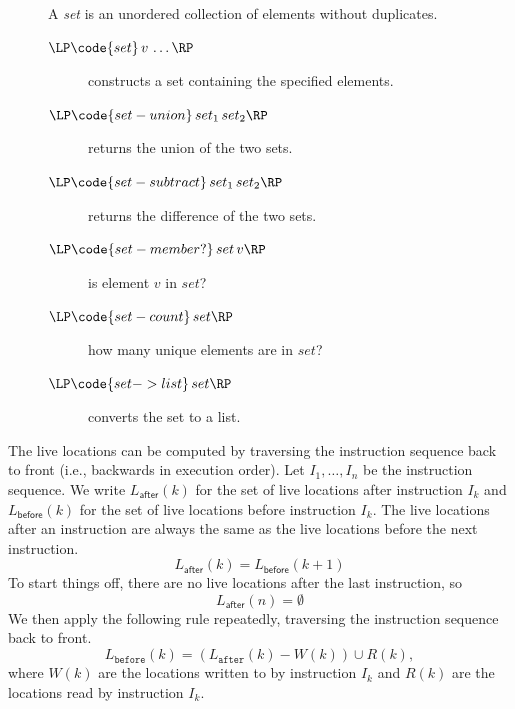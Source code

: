 \documentclass[11pt]{book}
\begin{document}
\begin{figure}
  \small
  \begin{tcolorbox}[title=\href{https://docs.racket-lang.org/reference/sets.html}{The Racket Set Package}]
    A \emph{set} is an unordered collection of elements without duplicates.
  \begin{description}
  \item[$\LP\code{set}\,v\,\ldots\RP$] constructs a set containing the specified elements.
  \item[$\LP\code{set-union}\,set_1\,set_2\RP$] returns the union of the two sets.
  \item[$\LP\code{set-subtract}\,set_1\,set_2\RP$] returns the difference of the two sets.
  \item[$\LP\code{set-member?}\,set\,v\RP$] is element $v$ in $set$?
  \item[$\LP\code{set-count}\,set\RP$] how many unique elements are in $set$?
  \item[$\LP\code{set->list}\,set\RP$] converts the set to a list.
  \end{description}
  \end{tcolorbox}
\end{figure}

The live locations can be computed by traversing the instruction
sequence back to front (i.e., backwards in execution order).  Let
$I_1,\ldots, I_n$ be the instruction sequence. We write
$L_{\mathsf{after}}(k)$ for the set of live locations after
instruction $I_k$ and $L_{\mathsf{before}}(k)$ for the set of live
locations before instruction $I_k$. The live locations after an
instruction are always the same as the live locations before the next
instruction.   
\begin{equation} \label{eq:live-after-before-next}
  L_{\mathsf{after}}(k) = L_{\mathsf{before}}(k+1)
\end{equation}
To start things off, there are no live locations after the last
instruction, so
\begin{equation}\label{eq:live-last-empty}
  L_{\mathsf{after}}(n) = \emptyset
\end{equation}
We then apply the following rule repeatedly, traversing the
instruction sequence back to front.
\begin{equation}\label{eq:live-before-after-minus-writes-plus-reads}
  L_{\mathtt{before}}(k) = (L_{\mathtt{after}}(k) - W(k)) \cup R(k),
\end{equation}
where $W(k)$ are the locations written to by instruction $I_k$ and
$R(k)$ are the locations read by instruction $I_k$.
\end{document}

